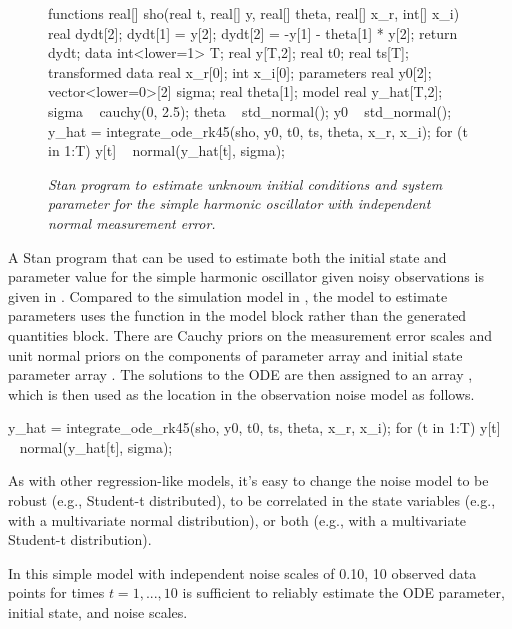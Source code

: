 %
\begin{figure}
\begin{stancode}
functions {
  real[] sho(real t,
             real[] y,
             real[] theta,
             real[] x_r,
             int[] x_i) {
    real dydt[2];
    dydt[1] = y[2];
    dydt[2] = -y[1] - theta[1] * y[2];
    return dydt;
  }
}
data {
  int<lower=1> T;
  real y[T,2];
  real t0;
  real ts[T];
}
transformed data {
  real x_r[0];
  int x_i[0];
}
parameters {
  real y0[2];
  vector<lower=0>[2] sigma;
  real theta[1];
}
model {
  real y_hat[T,2];
  sigma ~ cauchy(0, 2.5);
  theta ~ std_normal();
  y0 ~ std_normal();
  y_hat = integrate_ode_rk45(sho, y0, t0, ts, theta, x_r, x_i);
  for (t in 1:T)
    y[t] ~ normal(y_hat[t], sigma);
}
\end{stancode}
\vspace*{-0.2in}
\caption{\small\it Stan program to estimate unknown initial conditions
   and system parameter  for the simple harmonic
  oscillator with independent normal measurement
  error.}\label{sho-both.figure}
\end{figure}
%
A Stan program that can be used to estimate both the initial state and
parameter value for the simple harmonic oscillator given noisy
observations is given in .  Compared to the
simulation model in , the model to estimate
parameters uses the  function in the model block
rather than the generated quantities block.  There are Cauchy priors on the
measurement error scales  and unit normal priors on the
components of parameter array  and initial state parameter
array .  The solutions to the ODE are then assigned to an
array , which is then used as the location in the
observation noise model as follows.
%
\begin{stancode}
y_hat = integrate_ode_rk45(sho, y0, t0, ts, theta, x_r, x_i);
for (t in 1:T)
  y[t] ~ normal(y_hat[t], sigma);
\end{stancode}
%
As with other regression-like models, it's easy to change the noise
model to be robust (e.g., Student-t distributed), to be correlated in
the state variables (e.g., with a multivariate normal distribution),
or both (e.g., with a multivariate Student-t distribution).

In this simple model with independent noise scales of 0.10, 10
observed data points for times $t = 1, ..., 10$ is sufficient to
reliably estimate the ODE parameter, initial state, and noise scales.


